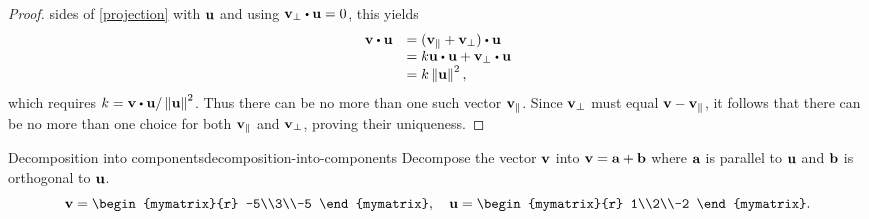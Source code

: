 \begin{proof}
  sides of {\eqref{projection}} with $\mbox{\bf u}$ and using
  $\vect{v}_{\bot }\dotprod \vect{u}=0$, this yields
  \begin{equation*}
    \begin{array}{ll}
      \vect{v}\dotprod \vect{u} & = ( \vect{v}_{\coll}+\vect{v}_{\bot }) \dotprod \vect{u} \\
                                & =  k\vect{u} \dotprod \vect{u} + \vect{v}_{\bot} \dotprod \vect{u} \\
                                & = k \norm{\vect{u}} ^{2},
    \end{array}
  \end{equation*}
  which requires
  $k =\vect{v}\dotprod \vect{u} / \norm{\vect{u}} ^{2}$.  Thus there
  can be no more than one such vector $\mbox{\bf v}_{\|}$. Since
  $\mbox{\bf v}_{\bot}$ must equal $\mbox{\bf v}-\mbox{\bf v}_{\|}$, it follows
  that there can be no more than one choice for both
  $\mbox{\bf v}_{\|}$ and $\mbox{\bf v}_{\bot}$, proving their uniqueness. 
\end{proof}

\begin{example}{Decomposition into components}{decomposition-into-components}
  Decompose the vector $\mbox{\bf v}$ into $\mbox{\bf v}=\mbox{\bf a}+\mbox{\bf b}$
  where $\mbox{\bf a}$ is parallel to $\mbox{\bf u}$ and $\mbox{\bf b}$ is
  orthogonal to $\mbox{\bf u}$.
  \begin{equation*}
    \vect{v} = \begin{mymatrix}{r} -5\\3\\-5 \end{mymatrix},\quad
    \vect{u} = \begin{mymatrix}{r} 1\\2\\-2 \end{mymatrix}.
  \end{equation*}
\end{example}

